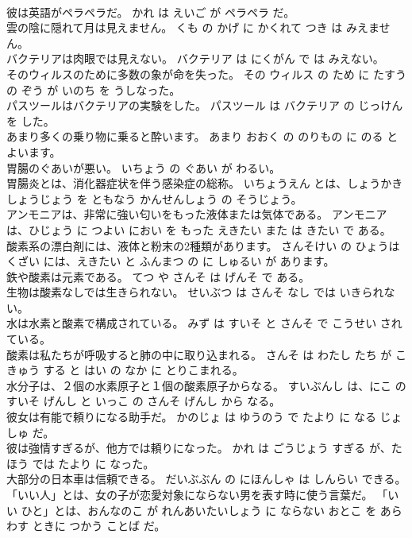 \documentclass[8pt]{extreport}
\begin{document}
\begin{CJK}{UTF8}{min}
\\	彼は英語がペラペラだ。	かれ は えいご が ペラペラ だ。	
\\	雲の陰に隠れて月は見えません。	くも の かげ に かくれて つき は みえません。	
\\	バクテリアは肉眼では見えない。	バクテリア は にくがん で は みえない。	
\\	そのウィルスのために多数の象が命を失った。	その ウィルス の ため に たすう の ぞう が いのち を うしなった。	
\\	パスツールはバクテリアの実験をした。	パスツール は バクテリア の じっけん を した。	
\\	あまり多くの乗り物に乗ると酔います。	あまり おおく の のりもの に のる と よいます。	
\\	胃腸のぐあいが悪い。	いちょう の ぐあい が わるい。	
\\	胃腸炎とは、消化器症状を伴う感染症の総称。	いちょうえん とは、しょうかき しょうじょう を ともなう かんせんしょう の そうじょう。	
\\	アンモニアは、非常に強い匂いをもった液体または気体である。	アンモニア は、ひじょう に つよい におい を もった えきたい また は きたい で ある。	
\\	酸素系の漂白剤には、液体と粉末の2種類があります。	さんそけい の ひょうはくざい には、えきたい と ふんまつ の に しゅるい が あります。	
\\	鉄や酸素は元素である。	てつ や さんそ は げんそ で ある。	
\\	生物は酸素なしでは生きられない。	せいぶつ は さんそ なし では いきられない。	
\\	水は水素と酸素で構成されている。	みず は すいそ と さんそ で こうせい されている。	
\\	酸素は私たちが呼吸すると肺の中に取り込まれる。	さんそ は わたし たち が こきゅう する と はい の なか に とりこまれる。	
\\	水分子は、２個の水素原子と１個の酸素原子からなる。	すいぶんし は、にこ の すいそ げんし と いっこ の さんそ げんし から なる。	
\\	彼女は有能で頼りになる助手だ。	かのじょ は ゆうのう で たより に なる じょしゅ だ。	
\\	彼は強情すぎるが、他方では頼りになった。	かれ は ごうじょう すぎる が、たほう では たより に なった。	
\\	大部分の日本車は信頼できる。	だいぶぶん の にほんしゃ は しんらい できる。	
\\	「いい人」とは、女の子が恋愛対象にならない男を表す時に使う言葉だ。	「いい ひと」とは、おんなのこ が れんあいたいしょう に ならない おとこ を あらわす ときに つかう ことば だ。	

\end{CJK}
\end{document}

